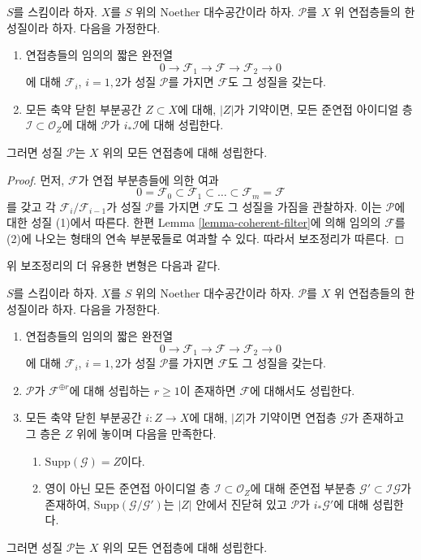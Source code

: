 \begin{lemma}
\label{lemma-property-initial}
$S$를 스킴이라 하자. $X$를 $S$ 위의 Noether 대수공간이라 하자.
$\mathcal{P}$를 $X$ 위 연접층들의 한 성질이라 하자. 다음을 가정한다.
\begin{enumerate}
\item 연접층들의 임의의 짧은 완전열
$$
0 \to \mathcal{F}_1 \to \mathcal{F} \to \mathcal{F}_2 \to 0
$$
에 대해 $\mathcal{F}_i$, $i = 1, 2$가 성질 $\mathcal{P}$를 가지면
$\mathcal{F}$도 그 성질을 갖는다.
\item 모든 축약 닫힌 부분공간 $Z \subset X$에 대해, $|Z|$가 기약이면,
모든 준연접 아이디얼 층 $\mathcal{I} \subset \mathcal{O}_Z$에 대해
$\mathcal{P}$가 $i_*\mathcal{I}$에 대해 성립한다.
\end{enumerate}
그러면 성질 $\mathcal{P}$는 $X$ 위의 모든 연접층에 대해 성립한다.
\end{lemma}

\begin{proof}
먼저, $\mathcal{F}$가 연접 부분층들에 의한 여과
$$
0 = \mathcal{F}_0 \subset \mathcal{F}_1 \subset
\ldots \subset \mathcal{F}_m = \mathcal{F}
$$
를 갖고 각 $\mathcal{F}_i/\mathcal{F}_{i - 1}$가 성질 $\mathcal{P}$를
가지면 $\mathcal{F}$도 그 성질을 가짐을 관찰하자. 이는
$\mathcal{P}$에 대한 성질 (1)에서 따른다. 한편 Lemma
\ref{lemma-coherent-filter}에 의해 임의의 $\mathcal{F}$를 (2)에 나오는
형태의 연속 부분몫들로 여과할 수 있다. 따라서 보조정리가 따른다.
\end{proof}

\noindent
위 보조정리의 더 유용한 변형은 다음과 같다.

\begin{lemma}
\label{lemma-property-higher-rank-cohomological}
$S$를 스킴이라 하자. $X$를 $S$ 위의 Noether 대수공간이라 하자.
$\mathcal{P}$를 $X$ 위 연접층들의 한 성질이라 하자. 다음을 가정한다.
\begin{enumerate}
\item 연접층들의 임의의 짧은 완전열
$$
0 \to \mathcal{F}_1 \to \mathcal{F} \to \mathcal{F}_2 \to 0
$$
에 대해 $\mathcal{F}_i$, $i = 1, 2$가 성질 $\mathcal{P}$를 가지면
$\mathcal{F}$도 그 성질을 갖는다.
\item $\mathcal{P}$가 $\mathcal{F}^{\oplus r}$에 대해 성립하는
$r \geq 1$이 존재하면 $\mathcal{F}$에 대해서도
성립한다.
\item 모든 축약 닫힌 부분공간 $i : Z \to X$에 대해, $|Z|$가 기약이면
연접층 $\mathcal{G}$가 존재하고 그 층은 $Z$ 위에 놓이며 다음을 만족한다.
\begin{enumerate}
\item $\text{Supp}(\mathcal{G}) = Z$이다.
\item 영이 아닌 모든 준연접 아이디얼 층
$\mathcal{I} \subset \mathcal{O}_Z$에 대해 준연접 부분층
$\mathcal{G}' \subset \mathcal{I}\mathcal{G}$가 존재하여,
$\text{Supp}(\mathcal{G}/\mathcal{G}')$는 $|Z|$ 안에서 진닫혀 있고
$\mathcal{P}$가 $i_*\mathcal{G}'$에 대해 성립한다.
\end{enumerate}
\end{enumerate}
그러면 성질 $\mathcal{P}$는 $X$ 위의 모든 연접층에 대해 성립한다.
\end{lemma}


